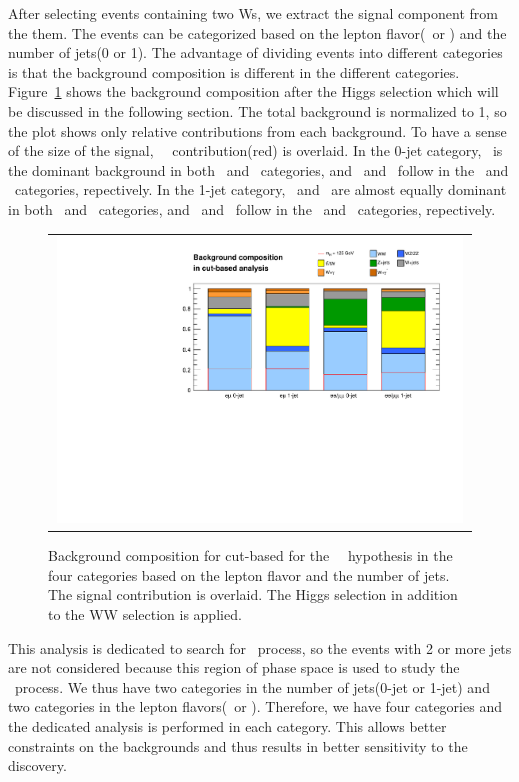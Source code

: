 After selecting events containing two Ws, we extract the signal component 
from the them. The events can be categorized based on the lepton flavor(\DF\ or \SF)
and the number of jets(0 or 1). The advantage of dividing events 
into different categories is that the background composition is different
in the different categories. 
Figure~\ref{fig:bkgcomposition} shows the background composition
after the Higgs selection which will be discussed in the following section.
The total background is normalized to 1, so the plot shows only relative 
contributions from each background. To have a sense of the size of the signal, 
~\GeV\ contribution(red) is overlaid. 
In the 0-jet category, \ww\ is the dominant background in both \DF\ and \SF\ 
categories, and \Wjets\ and \dyll\ follow in the \DF\ and \SF\ categories,
repectively. 
In the 1-jet category, \ww\ and \topbkg\ are almost equally dominant in both \DF\ and \SF\
categories, and \Wjets\ and \dyll\ follow in the \DF\ and \SF\ categories,
repectively.
%
\begin{figure}[htp] 
\centering 
\begin{tabular}{c} 
\includegraphics[width=0.99\textwidth]{figures/Bkgcomposition_cutbased.pdf} 
\end{tabular} 
\caption{Background composition for cut-based for the ~\GeV\ hypothesis
in the four categories based on the lepton flavor and the number of jets. 
The signal contribution is overlaid. The Higgs selection in addition to the  
WW selection is applied.  
} 
\label{fig:bkgcomposition} 
\end{figure} 

This analysis is dedicated to search for \ggH\ process, 
so the events with 2 or more jets are not considered 
because this region of phase space is used to study the \qqH\ process. 
We thus have two categories in the number of jets(0-jet or 1-jet) 
and two categories in the lepton flavors(\DF\ or \SF). 
Therefore, we have four categories and the dedicated analysis 
is performed in each category. This allows better constraints on the 
backgrounds and thus results in better sensitivity to the discovery.  


